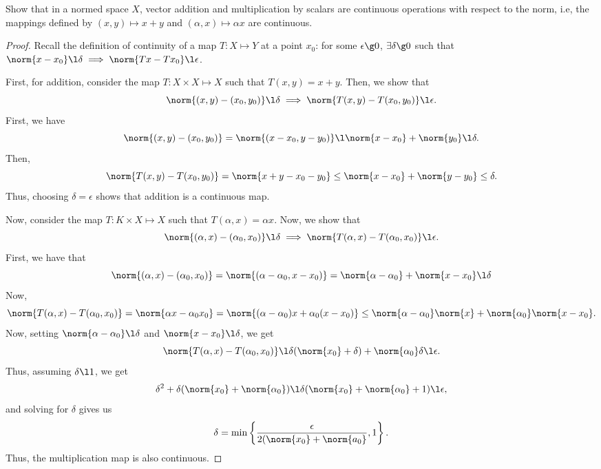 \begin{question}
    Show that in a normed space $X$, vector addition and multiplication by scalars are continuous operations with respect to the norm, i.e, the mappings defined by $(x,y) \mapsto x + y$ and $(\alpha , x) \mapsto \alpha x$ are continuous.
    \label{section2.3-4}
\end{question}
\begin{proof}
    Recall the definition of continuity of a map $T : X \mapsto Y$ at a point $x_0$: for some $\epsilon \g 0$, $\exists \delta \g 0$ such that $\norm{x - x_0} \l \delta \implies \norm{Tx - Tx_0} \l \epsilon$.

    First, for addition, consider the map $T : X \times X \mapsto X$ such that $T(x,y) = x + y$. Then, we show that 
    \[\norm{(x,y) - (x_0 , y_0)} \l \delta \implies \norm{T(x,y) - T(x_0 , y_0)} \l \epsilon.\]
    First, we have
    \[\norm{(x,y) - (x_0, y_0)} = \norm{(x - x_0 , y-y_0)} \l \norm{x - x_0} + \norm{y_0} \l \delta.\]
    Then, 
    \[\norm{T(x,y) - T(x_0 , y_0)} = \norm{x + y - x_0 - y_0} \leq \norm{x - x_0} + \norm{y - y_0} \leq \delta.\]
    Thus, choosing $\delta = \epsilon$ shows that addition is a continuous map.

    Now, consider the map $T : K \times X \mapsto X$ such that $T(\alpha , x) = \alpha x$. Now, we show that
    \[\norm{(\alpha , x) - (\alpha_0 , x_0)} \l \delta \implies \norm{T(\alpha , x) - T(\alpha_0 , x_0)} \l \epsilon.\]
    First, we have that
    \[\norm{(\alpha , x) - (\alpha_0 , x_0)} = \norm{(\alpha - \alpha_0 , x - x_0)} = \norm{\alpha - \alpha_0} + \norm{x - x_0} \l \delta\]
    Now, 
    \[\norm{T(\alpha , x) - T(\alpha_0 , x_0)} = \norm{\alpha x - \alpha_0 x_0} = \norm{(\alpha - \alpha_0)x + \alpha_0(x - x_0)} \leq \norm{\alpha - \alpha_0} \norm{x} + \norm{\alpha_0} \norm{x - x_0}.\]
    Now, setting $\norm{\alpha - \alpha_0} \l \delta$ and $\norm{x - x_0} \l \delta$, we get
    \[\norm{T(\alpha , x) - T(\alpha_0 , x_0)} \l \delta(\norm{x_0} + \delta) + \norm{\alpha_0}\delta \l \epsilon.\]
    Thus, assuming $\delta \l 1$, we get
    \[\delta^2 + \delta(\norm{x_0} + \norm{\alpha_0}) \l \delta(\norm{x_0} + \norm{\alpha_0} + 1) \l \epsilon,\] 
    and solving for $\delta$ gives us
    \[\delta = \min \left\{\frac{\epsilon}{2 ( \norm{x_0} + \norm{a_0}} , 1 \right\}.\]
    Thus, the multiplication map is also continuous.
\end{proof}

